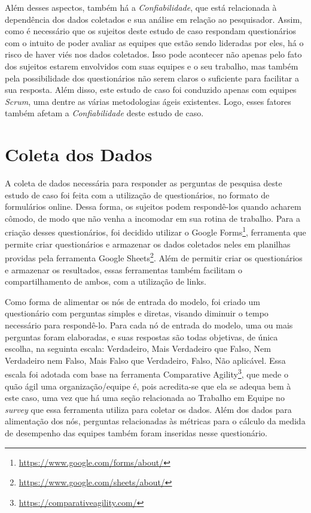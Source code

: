 Além desses aspectos, também há a \textit{Confiabilidade}, que está relacionada à dependência dos dados coletados e sua análise em relação ao pesquisador. Assim, como é necessário que os sujeitos deste estudo de caso respondam questionários com o intuito de poder avaliar as equipes que estão sendo lideradas por eles, há o risco de haver viés nos dados coletados. Isso pode acontecer não apenas pelo fato dos sujeitos estarem envolvidos com suas equipes e o seu trabalho, mas também pela possibilidade dos questionários não serem claros o suficiente para facilitar a sua resposta. Além disso, este estudo de caso foi conduzido apenas com equipes \textit{Scrum}, uma dentre as várias metodologias ágeis existentes. Logo, esses fatores também afetam a \textit{Confiabilidade} deste estudo de caso.

\section{Coleta dos Dados}
\label{estudodecaso:coleta}

A coleta de dados necessária para responder as perguntas de pesquisa deste estudo de caso foi feita com a utilização de questionários, no formato de formulários online. Dessa forma, os sujeitos podem respondê-los quando acharem cômodo, de modo que não venha a incomodar em sua rotina de trabalho. Para a criação desses questionários, foi decidido utilizar o Google Forms\footnote{\url{https://www.google.com/forms/about/}}, ferramenta que permite criar questionários e armazenar os dados coletados neles em planilhas providas pela ferramenta Google Sheets\footnote{\url{https://www.google.com/sheets/about/}}. Além de permitir criar os questionários e armazenar os resultados, essas ferramentas também facilitam o compartilhamento de ambos, com a utilização de links.

Como forma de alimentar os nós de entrada do modelo, foi criado um questionário com perguntas simples e diretas, visando diminuir o tempo necessário para respondê-lo. Para cada nó de entrada do modelo, uma ou mais perguntas foram elaboradas, e suas respostas são todas objetivas, de única escolha, na seguinta escala: Verdadeiro, Mais Verdadeiro que Falso, Nem Verdadeiro nem Falso, Mais Falso que Verdadeiro, Falso, Não aplicável. Essa escala foi adotada com base na ferramenta Comparative Agility\footnote{\url{https://comparativeagility.com/}}, que mede o quão ágil uma organização/equipe é, pois acredita-se que ela se adequa bem à este caso, uma vez que há uma seção relacionada ao Trabalho em Equipe no \textit{survey} que essa ferramenta utiliza para coletar os dados. Além dos dados para alimentação dos nós, perguntas relacionadas às métricas para o cálculo da medida de desempenho das equipes também foram inseridas nesse questionário.


